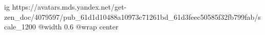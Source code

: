  
 
 
 
 

\ifcmt
  ig https://avatars.mds.yandex.net/get-zen_doc/4079597/pub_61d1d10488a10973c71261bd_61d3feec50585f32fb799fab/scale_1200
	@width 0.6
	@wrap center
\fi
